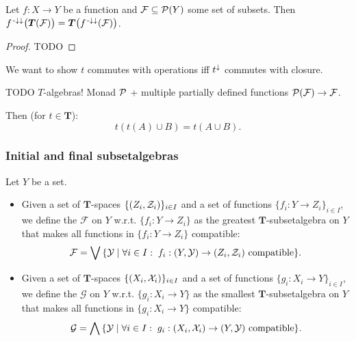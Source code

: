 \begin{lemma} \label{commutationTclosure}
Let $f: X\to Y$ be a function and $\mathcal{F}\subseteq \operatorname{\mathcal{P}}(Y)$ some set of subsets. Then $f^{{\text{\hspace{0.15em}-}\downarrow}\downarrow}\big(\boldsymbol{T}(\mathcal{F})\big) = \boldsymbol{T}\big(f^{{\text{\hspace{0.15em}-}\downarrow}\downarrow}(\mathcal{F})\big)$.
\end{lemma}
\begin{proof}
TODO
\end{proof}

We want to show $t$ commutes with operations iff $t^{\downarrow}$ commutes with closure.

TODO $T$-algebras! Monad $\operatorname{\mathcal{P}}$ + multiple partially defined functions $\operatorname{\mathcal{P}}(\mathcal{F}) \to \mathcal{F}$.

Then (for $t\in \boldsymbol{T}$):
\[ t(t(A)\cup B) = t(A\cup B). \]

\subsubsection{Initial and final subsetalgebras}
\begin{definition}
Let $Y$ be a set.
\begin{itemize}
\item Given a set of $\boldsymbol{T}$-spaces $\{\sSet{Z_i,\mathcal{Z}_i}\}_{i\in I}$ and a set of functions $\{f_i: Y\to Z_i\}_{i\in I}$, we define the  $\mathcal{F}$ on $Y$ w.r.t. $\{f_i: Y\to Z_i\}$ as the greatest $\boldsymbol{T}$-subsetalgebra on $Y$ that makes all functions in $\{f_i: Y\to Z_i\}$ compatible:
\[ \mathcal{F} = \bigvee \setbuilder{\mathcal{Y}}{\forall i\in I: \;\text{$f_i: \sSet{Y,\mathcal{Y}} \to \sSet{Z_i, \mathcal{Z}_i}$ compatible}}. \]
\item Given a set of $\boldsymbol{T}$-spaces $\{\sSet{X_i,\mathcal{X}_i}\}_{i\in I}$ and a set of functions $\{g_i: X_i \to Y\}_{i\in I}$, we define the  $\mathcal{G}$ on $Y$ w.r.t. $\{g_i: X_i\to Y\}$ as the smallest $\boldsymbol{T}$-subsetalgebra on $Y$ that makes all functions in $\{g_i: X_i \to Y\}$ compatible:
\[ \mathcal{G} = \bigwedge \setbuilder{\mathcal{Y}}{\forall i\in I: \;\text{$g_i: \sSet{X_i,\mathcal{X}_i} \to \sSet{Y, \mathcal{Y}}$ compatible}}. \]
\end{itemize}
\end{definition}

